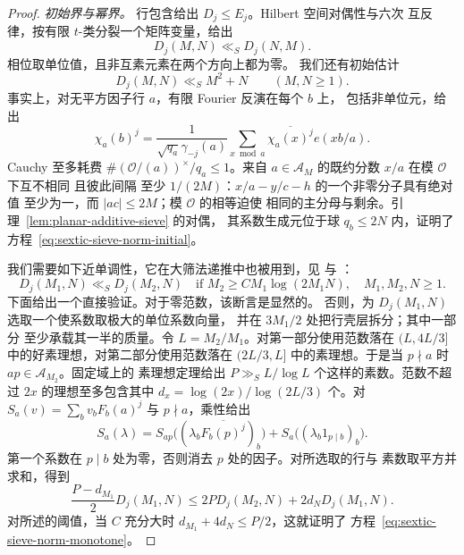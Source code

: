 \documentclass[11pt,a4paper]{article}
\numberwithin{equation}{section}
\numberwithin{figure}{section}
\theoremstyle{definition}
\theoremstyle{remark}
\begin{document}
\begin{proof}
\medskip\noindent\emph{初始界与幂界。}
行包含给出 $D_j\le E_j$。Hilbert 空间对偶性与六次
互反律，按有限 $t$-类分裂一个矩阵变量，给出
\begin{equation}\label{eq:sextic-sieve-norm-symmetry}
 D_j(M,N)\ll_S D_j(N,M).
\end{equation}
相位取单位值，且非互素元素在两个方向上都为零。
我们还有初始估计
\begin{equation}\label{eq:sextic-sieve-norm-initial}
 D_j(M,N)\ll_S M^2+N\qquad(M,N\ge1).
\end{equation}
事实上，对无平方因子行 $a$，有限 Fourier 反演在每个 $b$ 上，
包括非单位元，给出
\[
 \chi_a(b)^j=\frac1{\sqrt{q_a}\gamma_{-j}(a)}
       \sum_{x\bmod a}\overline{\chi_a(x)^j}e(xb/a).
\]
Cauchy 至多耗费 $\#(\mathcal O/(a))^\times/q_a\le1$。来自
$a\in\mathcal A_M$ 的既约分数 $x/a$ 在模 $\mathcal O$ 下互不相同
且彼此间隔
至少 $1/(2M)$：$x/a-y/c-h$ 的一个非零分子具有绝对值
至少为一，而 $|ac|\le2M$；模 $\mathcal O$ 的相等迫使
相同的主分母与剩余。引理~\ref{lem:planar-additive-sieve} 的对偶，
其系数生成元位于球 $q_b\le2N$ 内，证明了方程~\eqref{eq:sextic-sieve-norm-initial}。

我们需要如下近单调性，它在大筛法递推中也被用到，见 \cite[引理~4.4 和注记~5]{GL} 与
\cite[引理~3.1]{BGL}：
\begin{equation}\label{eq:sextic-sieve-norm-monotone}
 D_j(M_1,N)\ll_S D_j(M_2,N)
 \quad\text{if }M_2\ge C M_1\log(2M_1N),\quad M_1,M_2,N\ge1.
\end{equation}
下面给出一个直接验证。对于零范数，该断言是显然的。
否则，为 $D_j(M_1,N)$ 选取一个使系数取极大的单位系数向量，
并在 $3M_1/2$ 处把行壳层拆分；其中一部分
至少承载其一半的质量。令 $L=M_2/M_1$。对第一部分使用范数落在
$(L,4L/3]$ 中的好素理想，对第二部分使用范数落在
$(2L/3,L]$ 中的素理想。于是当 $p\nmid a$ 时 $ap\in\mathcal A_{M_2}$。固定域上的
素理想定理给出 $P\gg_S L/\log L$ 个这样的素数。范数不超过 $2x$ 的理想至多包含其中
$d_x=\log(2x)/\log(2L/3)$ 个。对
$S_a(v)=\sum_bv_bF_b(a)^j$ 与 $p\nmid a$，乘性给出
\[
 S_a(\lambda)=S_{ap}\bigl((\lambda_b\overline{F_b(p)^j})_b\bigr)
                  +S_a\bigl((\lambda_b1_{p\mid b})_b\bigr).
\]
第一个系数在 $p\mid b$ 处为零，否则消去 $p$ 处的因子。对所选取的行与
素数取平方并求和，得到
\[
 \frac{P-d_{M_1}}2D_j(M_1,N)
 \le2P D_j(M_2,N)+2d_ND_j(M_1,N).
\]
对所述的阈值，当 $C$ 充分大时
$d_{M_1}+4d_N\le P/2$，这就证明了
方程~\eqref{eq:sextic-sieve-norm-monotone}。


\end{proof}
\end{document}
